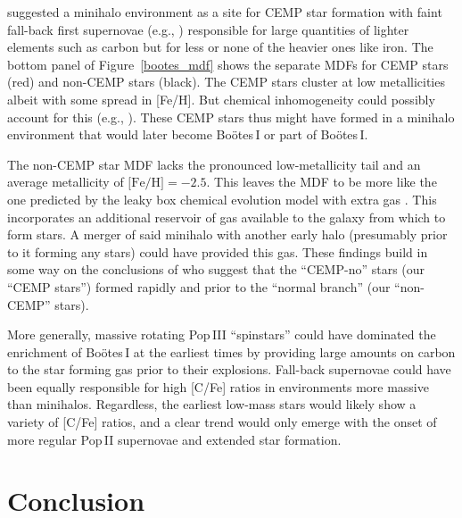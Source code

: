 \documentclass[]{emulateapj}
\begin{document}
\citet{cooke14} suggested a minihalo environment as a site for CEMP
star formation with faint fall-back first supernovae (e.g.,
\citealt{UmedaNomotoNature}) responsible for large quantities of
lighter elements such as carbon but for less or none of the heavier
ones like iron. The bottom panel of Figure~\ref{bootes_mdf}  shows the separate MDFs
for CEMP stars (red) and non-CEMP stars (black). The CEMP stars
cluster at low metallicities albeit with some spread in [Fe/H]. But
chemical inhomogeneity could possibly account for this (e.g.,
\citealt{frebel12}). These CEMP stars thus might have formed in a
minihalo environment that would later become Bo\"otes\,I or part of
Bo\"otes\,I.


The non-CEMP star MDF lacks the pronounced low-metallicity tail and an
average metallicity of $\mbox{[Fe/H]}=-2.5$. This leaves the MDF to be
more like the one predicted by the leaky box chemical evolution model
with extra gas \citep{lai11,kirby11}. This incorporates an additional
reservoir of gas available to the galaxy from which to form stars. A
merger of said minihalo with another early halo (presumably prior to
it forming any stars) could have provided this gas. These findings
build in some way on the conclusions of \citet{gilmore13} who suggest
that the ``CEMP-no'' stars (our ``CEMP stars'') formed rapidly and
prior to the ``normal branch'' (our ``non-CEMP'' stars).

More generally, massive rotating Pop\,III ``spinstars''
\citep{meynet06,chiappini11} could have dominated the enrichment of
Bo\"otes\,I at the earliest times by providing large amounts on carbon
to the star forming gas prior to their explosions. Fall-back
supernovae \citep{UmedaNomotoNature} could have been equally
responsible for high [C/Fe] ratios in environments more massive than
minihalos. Regardless, the earliest low-mass stars would likely show a
variety of [C/Fe] ratios, and a clear trend would only emerge with the
onset of more regular Pop\,II supernovae and extended star formation.



\section{Conclusion}\label{sec:conc}
\end{document}
